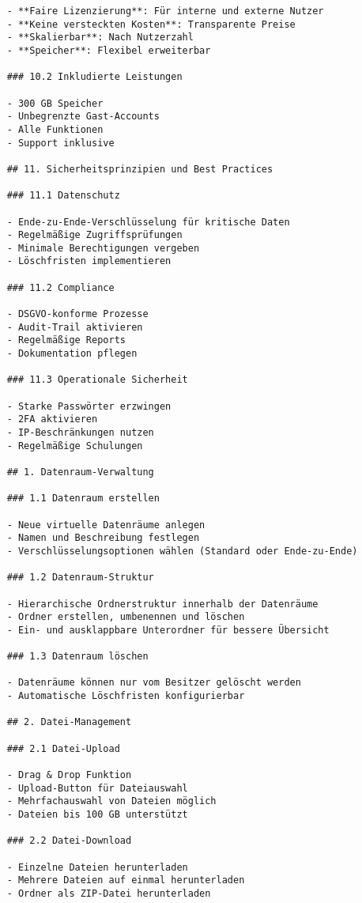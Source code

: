 \begin{verbatim}
    - **Faire Lizenzierung**: Für interne und externe Nutzer
    - **Keine versteckten Kosten**: Transparente Preise
    - **Skalierbar**: Nach Nutzerzahl
    - **Speicher**: Flexibel erweiterbar
    
    ### 10.2 Inkludierte Leistungen
    
    - 300 GB Speicher
    - Unbegrenzte Gast-Accounts
    - Alle Funktionen
    - Support inklusive
    
    ## 11. Sicherheitsprinzipien und Best Practices
    
    ### 11.1 Datenschutz
    
    - Ende-zu-Ende-Verschlüsselung für kritische Daten
    - Regelmäßige Zugriffsprüfungen
    - Minimale Berechtigungen vergeben
    - Löschfristen implementieren
    
    ### 11.2 Compliance
    
    - DSGVO-konforme Prozesse
    - Audit-Trail aktivieren
    - Regelmäßige Reports
    - Dokumentation pflegen
    
    ### 11.3 Operationale Sicherheit
    
    - Starke Passwörter erzwingen
    - 2FA aktivieren
    - IP-Beschränkungen nutzen
    - Regelmäßige Schulungen
    
    ## 1. Datenraum-Verwaltung
    
    ### 1.1 Datenraum erstellen
    
    - Neue virtuelle Datenräume anlegen
    - Namen und Beschreibung festlegen
    - Verschlüsselungsoptionen wählen (Standard oder Ende-zu-Ende)
    
    ### 1.2 Datenraum-Struktur
    
    - Hierarchische Ordnerstruktur innerhalb der Datenräume
    - Ordner erstellen, umbenennen und löschen
    - Ein- und ausklappbare Unterordner für bessere Übersicht
    
    ### 1.3 Datenraum löschen
    
    - Datenräume können nur vom Besitzer gelöscht werden
    - Automatische Löschfristen konfigurierbar
    
    ## 2. Datei-Management
    
    ### 2.1 Datei-Upload
    
    - Drag & Drop Funktion
    - Upload-Button für Dateiauswahl
    - Mehrfachauswahl von Dateien möglich
    - Dateien bis 100 GB unterstützt
    
    ### 2.2 Datei-Download
    
    - Einzelne Dateien herunterladen
    - Mehrere Dateien auf einmal herunterladen
    - Ordner als ZIP-Datei herunterladen
    

\end{verbatim}
